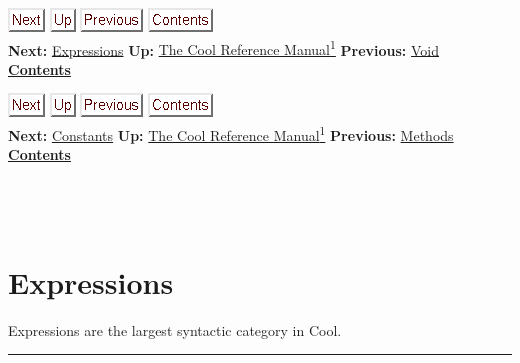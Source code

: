 \documentclass[]{article}
\begin{document}
\href{node13.html}{\includegraphics{next.png}}
\href{cool-manual.html}{\includegraphics{up.png}}
\href{node11.html}{\includegraphics{prev.png}}
\href{node1.html}{\includegraphics{contents.png}} \\ \textbf{Next:}
\href{node13.html}{Expressions} \textbf{Up:} \href{cool-manual.html}{The
Cool Reference Manual\textsuperscript{1}} \textbf{Previous:}
\href{node11.html}{Void} ~ \textbf{\href{node1.html}{Contents}}

\href{node14.html}{\includegraphics{next.png}}
\href{cool-manual.html}{\includegraphics{up.png}}
\href{node12.html}{\includegraphics{prev.png}}
\href{node1.html}{\includegraphics{contents.png}} \\ \textbf{Next:}
\href{node14.html}{Constants} \textbf{Up:} \href{cool-manual.html}{The
Cool Reference Manual\textsuperscript{1}} \textbf{Previous:}
\href{node12.html}{Methods} ~ \textbf{\href{node1.html}{Contents}} \\ \\

\section{\\ Expressions}

Expressions are the largest syntactic category in Cool. \\

\begin{center}\rule{3in}{0.4pt}\end{center}
\end{document}
